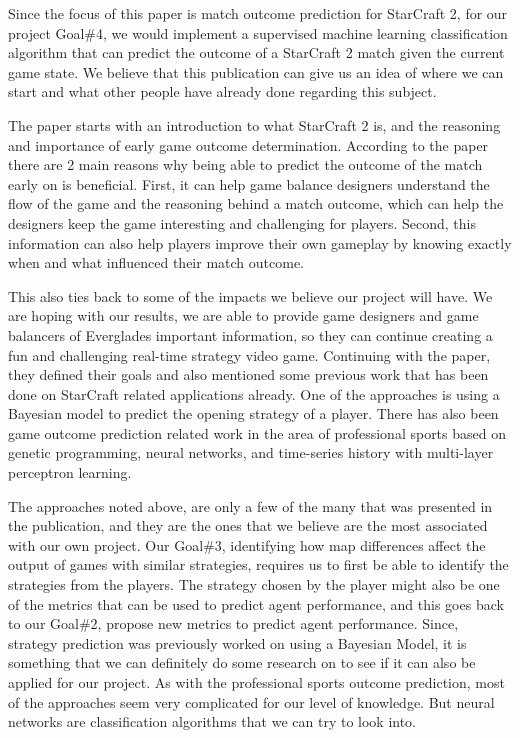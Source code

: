 \documentclass[a4paper,12pt]{report}
\begin{document}
Since the focus of this paper is match outcome prediction for StarCraft 2, for our project Goal\#4, we would implement a supervised machine learning classification algorithm that can predict the outcome of a StarCraft 2 match given the current game state. We believe that this publication can give us an idea of where we can start and what other people have already done regarding this subject.

The paper starts with an introduction to what StarCraft 2 is, and the reasoning and importance of early game outcome determination. According to the paper there are 2 main reasons why being able to predict the outcome of the match early on is beneficial. First, it can help game balance designers understand the flow of the game and the reasoning behind a match outcome, which can help the designers keep the game interesting and challenging for players. Second, this information can also help players improve their own gameplay by knowing exactly when and what influenced their match outcome.

This also ties back to some of the impacts we believe our project will have. We are hoping with our results, we are able to provide game designers and game balancers of Everglades important information, so they can continue creating a fun and challenging real-time strategy video game.
Continuing with the paper, they defined their goals and also mentioned some previous work that has been done on StarCraft related applications already. One of the approaches is using a Bayesian model to predict the opening strategy of a player. There has also been game outcome prediction related work in the area of professional sports based on genetic programming, neural networks, and time-series history with multi-layer perceptron learning.

The approaches noted above, are only a few of the many that was presented in the publication, and they are the ones that we believe are the most associated with our own project. Our Goal\#3, identifying how map differences affect the output of games with similar strategies, requires us to first be able to identify the strategies from the players. The strategy chosen by the player might also be one of the metrics that can be used to predict agent performance, and this goes back to our Goal\#2, propose new metrics to predict agent performance. Since, strategy prediction was previously worked on using a Bayesian Model, it is something that we can definitely do some research on to see if it can also be applied for our project. As with the professional sports outcome prediction, most of the approaches seem very complicated for our level of knowledge. But neural networks are classification algorithms that we can try to look into.
\end{document}
